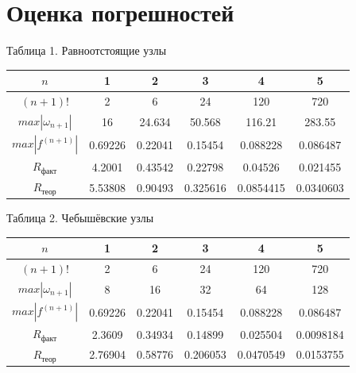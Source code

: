 \documentclass{article}
\begin{document}
	\section{Оценка погрешностей}
	\begin{flushright}
		Таблица 1. Равноотстоящие узлы
	\end{flushright}
	\begin{table}[!h]
		\centering
		\begin{tabular}{|c|c|c|c|c|c|}
			\hline
			$n$              & 1       & 2       & 3       & 4        & 5        \\ \hline
			$(n+1)!$         & 2       & 6       & 24      & 120      & 720      \\ \hline
			$max|\omega_{n+1}|$   & 16      & 24.634  & 50.568  & 116.21   & 283.55   \\ \hline
			$max|f^{(n+1)}|$ & 0.69226 & 0.22041 & 0.15454 & 0.088228 & 0.086487 \\ \hline
			$R_\text{факт}$              & 4.2001 &    0.43542     &    0.22798     &     0.04526     &     0.021455     \\ \hline
			$R_\text{теор}$              &   5.53808      &     0.90493     &   0.325616      &    0.0854415       &    0.0340603      \\ \hline
		\end{tabular}
	\end{table}
\begin{flushright}
	Таблица 2. Чебышёвские узлы
\end{flushright}
\begin{table}[!h]
	\centering
	\begin{tabular}{|c|c|c|c|c|c|}
		\hline
		$n$              & 1       & 2       & 3       & 4        & 5        \\ \hline
		$(n+1)!$         & 2       & 6       & 24      & 120      & 720      \\ \hline
		$max|\omega_{n+1}|$   & 8      & 16  & 32  & 64   & 128  \\ \hline
		$max|f^{(n+1)}|$ & 0.69226 & 0.22041 & 0.15454 & 0.088228 & 0.086487 \\ \hline
		$R_\text{факт}$              & 2.3609 &    0.34934     &    0.14899     &     0.025504     &     0.0098184     \\ \hline
		$R_\text{теор}$     &  2.76904  &  0.58776   &  0.206053    &   0.0470549  &   0.0153755   \\ \hline
	\end{tabular}
\end{table}
	
\end{document}

